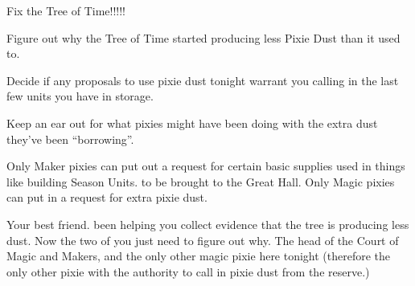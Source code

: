 \documentclass[char]{PP}
\begin{document}
\begin{itemz}
	\item Fix the Tree of Time!!!!!
	\item Figure out why the Tree of Time started producing less Pixie Dust than it used to.
	\item Decide if any proposals to use pixie dust tonight warrant you calling in the last few units you have in storage.
	\item Keep an ear out for what pixies might have been doing with the extra dust they’ve been “borrowing”.
\end{itemz}

\begin{itemz}[Notes]
	\item Only Maker pixies can put out a request for certain basic supplies used in things like building Season Units. to be brought to the Great Hall. Only Magic pixies can put in a request for extra pixie dust.
\end{itemz}

\begin{contacts}
	\contact{\cSHelp{}} Your best friend. \cSHelp{\They} \cSHelp{\have} been helping you collect evidence that the tree is producing less dust. Now the two of you just need to figure out why.
	\contact{\cMHead{}} The head of the Court of Magic and Makers, and the only other magic pixie here tonight (therefore the only other pixie with the authority to call in pixie dust from the reserve.)
\end{contacts}
\end{document}
